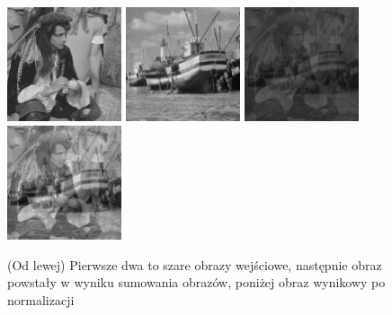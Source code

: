 \documentclass[final,a4paper,openany,12pt]{mwbk}
\begin{document}
\begin{figure}[H]
	\begin{center}
		\includegraphics[width=0.3\textwidth]{2/2Gray_Img1_Sum_Original}
		\includegraphics[width=0.3\textwidth]{2/2Gray_Img2_Sum_Original}
		\includegraphics[width=0.3\textwidth]{2/2Gray_Img_Sum_Result}
		\includegraphics[width=0.3\textwidth]{2/2Gray_Img_Sum_Result_Norm}
	\end{center}
	\caption{(Od lewej) Pierwsze dwa to szare obrazy wejściowe, następnie obraz powstały w wyniku sumowania obrazów, poniżej obraz wynikowy po normalizacji }
\end{figure}
\end{document}
